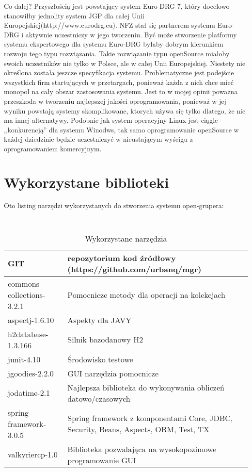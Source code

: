 Co dalej?
Przyszłością jest powstający system Euro-DRG 7, który docelowo stanowiłby jednolity system JGP dla całej Unii Europejskiej(http://www.eurodrg.eu).
NFZ stał się partnerem systemu Euro-DRG i aktywnie uczestniczy w jego tworzeniu. Być może stworzenie platformy systemu ekspertowego dla systemu Euro-DRG byłaby dobrym kierunkiem rozwoju tego typu rozwiązania. Takie rozwiązanie typu openSource miałoby swoich uczestników nie tylko w Polsce, ale w całej Unii Europejskiej. Niestety nie określona została jeszcze specyfikacja systemu. Problematyczne jest podejście wszystkich firm startujących w przetargach, ponieważ każda z nich chce mieć monopol na cały obszar zastosowania systemu. Jest to w mojej opinii poważna przeszkoda w tworzeniu najlepszej jakości oprogramowania, ponieważ w jej wyniku powstają systemy skomplikowane, ktorych używa się tylko dlatego, że nie ma innej alternatywy. Podobnie jak system operacyjny Linux jest ciągle ,,konkurencją'' dla systemu Winodws, tak samo oprogramowanie openSource w każdej dziedzinie będzie uczestniczyć w nieustającym wyścigu z oprogramowaniem komercyjnym. 


\section{Wykorzystane biblioteki}
\label{sec:wykorzystaneBiblioteki}
Oto listing narzędzi wykorzystanych do stworzenia systemu open-grupera:
\begin{table}[h]
 \caption{Wykorzystane narzędzia}
 \small\tt
 \centering
 \vspace{0in}
 \begin{tabular}{|l|p{7cm}|}
 \hline
 GIT & repozytorium kod źródłowy (https://github.com/urbanq/mgr) \\
 \hline
 commons-collections-3.2.1 & Pomocnicze metody dla operacji na kolekcjach \\
 \hline
 aspectj-1.6.10 & Aspekty dla JAVY \\
 \hline
 h2database-1.3.166 & Silnik bazodanowy H2 \\
 \hline
 junit-4.10 & Środowisko testowe \\
 \hline
 jgoodies-2.2.0 & GUI narzędzia pomocnicze \\
 \hline
 jodatime-2.1 & Najlepsza biblioteka do wykonywania obliczeń datowo/czasowych \\
 \hline
 spring-framework-3.0.5 & Spring framework z komponentami Core, JDBC, Security, Beans, Aspects, ORM, Test, TX \\
 \hline
 valkyriercp-1.0 & Biblioteka pozwalająca na wysokopozimowe programowanie GUI \\
 \hline
 \end{tabular}
\end{table}

